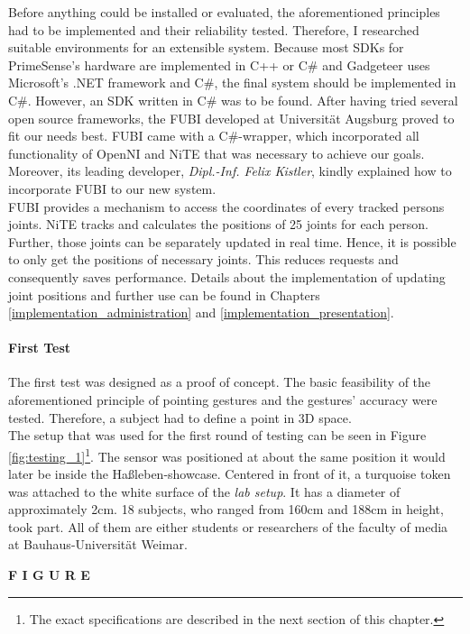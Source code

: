 Before anything could be installed or evaluated, the aforementioned principles had to be implemented and their reliability tested. Therefore, I researched suitable environments for an extensible system. Because most \ac{SDK}s for PrimeSense's hardware are implemented in C++ or C$\#$ and Gadgeteer uses Microsoft's .NET framework and C$\#$, the final system should be implemented in C$\#$. However, an \ac{SDK} written in C$\#$ was to be found. After having tried several open source frameworks, the \ac{FUBI} developed at Universität Augsburg proved to fit our needs best. \ac{FUBI} came with a C$\#$-wrapper, which incorporated all functionality of OpenNI and NiTE that was necessary to achieve our goals. Moreover, its leading developer, \textit{Dipl.-Inf. Felix Kistler}, kindly explained how to incorporate \ac{FUBI} to our new system. 
\\
\ac{FUBI} provides a mechanism to access the coordinates of every tracked persons joints. NiTE tracks and calculates the positions of 25 joints for each person. Further, those joints can be separately updated in real time. Hence, it is possible to only get the positions of necessary joints. This reduces requests and consequently saves performance. Details about the implementation of updating joint positions and further use can be found in Chapters \ref{implementation_administration} and \ref{implementation_presentation}.

\paragraph{First Test} The first test was designed as a proof of concept. The basic feasibility of the aforementioned principle of pointing gestures and the gestures' accuracy were tested. Therefore, a subject had to define a point in \ac{3D} space.
\\ 
The setup that was used for the first round of testing can be seen in Figure \ref{fig:testing_1}\footnote{The exact specifications are described in the next section of this chapter.}. The sensor was positioned at about the same position it would later be inside the Haßleben-showcase. Centered in front of it, a turquoise token was attached to the white surface of the \textit{lab setup}. It has a diameter of approximately 2cm. 18 subjects, who ranged from 160cm and 188cm in height, took part. All of them are either students or researchers of the faculty of media at Bauhaus-Universität Weimar.

\textbf{F I G U R E}

